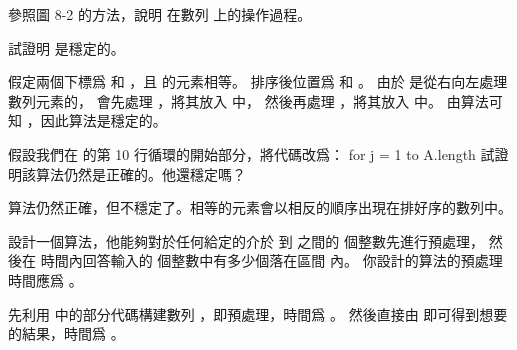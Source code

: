 \startsection[
  title={Counting sort},
]

\startEXERCISE
參照圖 8-2 的方法，說明  在數列  上的操作過程。
\stopEXERCISE

\startANSWER
\externalfigure[output/e8_2_1-1]
\externalfigure[output/e8_2_1-2]
\externalfigure[output/e8_2_1-3]
\externalfigure[output/e8_2_1-4]
\externalfigure[output/e8_2_1-5]
\externalfigure[output/e8_2_1-6]
\externalfigure[output/e8_2_1-7]
\externalfigure[output/e8_2_1-8]
\externalfigure[output/e8_2_1-9]
\externalfigure[output/e8_2_1-10]
\externalfigure[output/e8_2_1-11]
\externalfigure[output/e8_2_1-12]
\externalfigure[output/e8_2_1-13]
\stopANSWER

\startEXERCISE
試證明  是穩定的。
\stopEXERCISE

\startANSWER
假定兩個下標爲  和 ，且  的元素相等。
排序後位置爲  和 。
由於  是從右向左處理數列元素的，
會先處理 ，將其放入  中，
然後再處理 ，將其放入  中。
由算法可知 ，因此算法是穩定的。
\stopANSWER

\startEXERCISE
假設我們在  的第 10 行循環的開始部分，將代碼改爲：
\startCLRS[start=10]
for j = 1 to A.length
\stopCLRS
試證明該算法仍然是正確的。他還穩定嗎？
\stopEXERCISE

\startANSWER
算法仍然正確，但不穩定了。相等的元素會以相反的順序出現在排好序的數列中。
\stopANSWER

\startEXERCISE
設計一個算法，他能夠對於任何給定的介於  到  之間的  個整數先進行預處理，
然後在  時間內回答輸入的  個整數中有多少個落在區間 \m{[a..b]} 內。
你設計的算法的預處理時間應爲 。
\stopEXERCISE

\startANSWER
先利用  中的部分代碼構建數列 ，即預處理，時間爲 。
然後直接由  即可得到想要的結果，時間爲 。
\stopANSWER

\stopsection
